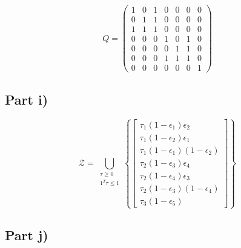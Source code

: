 \documentclass[10pt,a4paper]{article}
\begin{document}
\begin{equation*}
  Q = \begin{pmatrix}
    1 & 0 & 1 & 0 & 0 & 0 & 0\\
    0 & 1 & 1 & 0 & 0 & 0 & 0\\
    1 & 1 & 1 & 0 & 0 & 0 & 0\\
    0 & 0 & 0 & 1 & 0 & 1 & 0\\
    0 & 0 & 0 & 0 & 1 & 1 & 0\\
    0 & 0 & 0 & 1 & 1 & 1 & 0\\
    0 & 0 & 0 & 0 & 0 & 0 & 1
  \end{pmatrix}
\end{equation*}

\subsection*{Part i)}

\begin{equation*}
  \mathcal{Z} = \bigcup_{\substack{\tau \ge 0\\1^{T}\tau \le 1}} \left\{
    \begin{bmatrix}
      \tau_{1} (1 - \epsilon_{1}) \epsilon_{2}\\
      \tau_{1} (1 - \epsilon_{2}) \epsilon_{1}\\
      \tau_{1} (1 - \epsilon_{1}) (1 - \epsilon_{2})\\
      \tau_{2} (1 - \epsilon_{3}) \epsilon_{4}\\
      \tau_{2} (1 - \epsilon_{4}) \epsilon_{3}\\
      \tau_{2} (1 - \epsilon_{3}) (1 - \epsilon_{4})\\
      \tau_{3} (1 - \epsilon_{5})
    \end{bmatrix}
  \right\}
\end{equation*}

\subsection*{Part j)}
\end{document}
